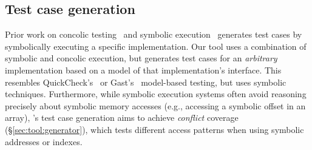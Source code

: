 
\subsection{Test case generation}

Prior work on concolic testing~\cite{godefroid:dart,sen:cute}
and symbolic execution~\cite{cadar:exe,cadar:klee} generates test
cases by symbolically executing a specific implementation.
%
Our \tool tool uses a combination of symbolic and concolic execution, but
generates
test cases for an {\em arbitrary} implementation based on a model
of that implementation's interface.  This resembles
QuickCheck's~\cite{claessen:quickcheck} or Gast's~\cite{koopman:gast}
model-based testing, but uses symbolic techniques.
%
Furthermore, while symbolic execution systems
often avoid reasoning precisely about symbolic memory accesses (e.g.,
accessing a symbolic offset in an array),
\tool's test case generation aims to achieve \emph{conflict} coverage
(\S\ref{sec:tool:generator}), which tests different access
patterns when using symbolic addresses or indexes.

